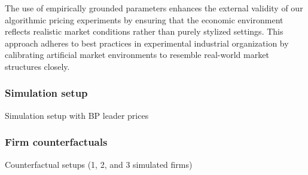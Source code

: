 The use of empirically grounded parameters enhances the external validity of our algorithmic pricing experiments by ensuring that the economic environment reflects realistic market conditions rather than purely stylized settings. This approach adheres to best practices in experimental industrial organization by calibrating artificial market environments to resemble real-world market structures closely.

\subsubsection*{Simulation setup}
Simulation setup with BP leader prices

\subsubsection*{Firm counterfactuals}
Counterfactual setups (1, 2, and 3 simulated firms)